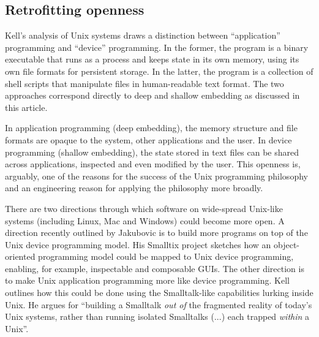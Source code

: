 \subsection{Retrofitting openness}

Kell's analysis of Unix systems draws a distinction between ``application''
programming and ``device'' programming. In the former,
the program is a binary executable that runs as a process and keeps state in its own memory,
using its own file formats for persistent storage. In the latter, the program is a
collection of shell scripts that manipulate files in human-readable text format.
The two approaches correspond directly to deep and shallow embedding as discussed in this article.

In application programming (deep embedding), the memory structure and file formats are opaque
to the system, other applications and the user. In device programming (shallow embedding), the
state stored in text files can be shared across applications, inspected and even modified by the user.
This openness is, arguably, one of the reasons for the success of the Unix
programming philosophy and an engineering reason for
applying the philosophy more broadly.

There are two directions through which software on wide-spread Unix-like systems
(including Linux, Mac and Windows) could become more open. A direction recently outlined by
Jakubovic is to build more programs
on top of the Unix device programming model. His Smalltix project sketches how an object-oriented
programming model could be mapped to Unix device programming, enabling, for example, inspectable and
composable GUIs. The other direction is to make Unix application programming more like device
programming. Kell outlines how this could be done using the Smalltalk-like capabilities
lurking inside Unix.
He argues for ``building a Smalltalk \emph{out of} the fragmented reality of today's Unix systems,
rather than running isolated Smalltalks (...) each trapped \emph{within} a Unix''.

